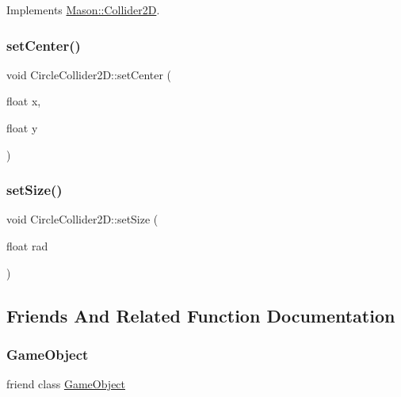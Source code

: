 Implements \hyperlink{class_mason_1_1_collider2_d_a3394739f1fea805691ac2753a9272156}{Mason\+::\+Collider2D}.

\hypertarget{class_mason_1_1_circle_collider2_d_aa0e943bbb6fb5b9f33110959a845ed76}{}\label{class_mason_1_1_circle_collider2_d_aa0e943bbb6fb5b9f33110959a845ed76} 
\subsubsection{\texorpdfstring{set\+Center()}{setCenter()}}
{\footnotesize\ttfamily void Circle\+Collider2\+D\+::set\+Center (\begin{DoxyParamCaption}\item[{float}]{x,  }\item[{float}]{y }\end{DoxyParamCaption})}

\hypertarget{class_mason_1_1_circle_collider2_d_aa91dcf071566c9862cf1ac385ad9f4a9}{}\label{class_mason_1_1_circle_collider2_d_aa91dcf071566c9862cf1ac385ad9f4a9} 
\subsubsection{\texorpdfstring{set\+Size()}{setSize()}}
{\footnotesize\ttfamily void Circle\+Collider2\+D\+::set\+Size (\begin{DoxyParamCaption}\item[{float}]{rad }\end{DoxyParamCaption})}



\subsection{Friends And Related Function Documentation}
\hypertarget{class_mason_1_1_circle_collider2_d_a00df87c957d8f7ee0fc51f07a0542f4a}{}\label{class_mason_1_1_circle_collider2_d_a00df87c957d8f7ee0fc51f07a0542f4a} 
\subsubsection{\texorpdfstring{Game\+Object}{GameObject}}
{\footnotesize\ttfamily friend class \hyperlink{class_mason_1_1_game_object}{Game\+Object}\hspace{0.3cm}{\ttfamily [friend]}}



